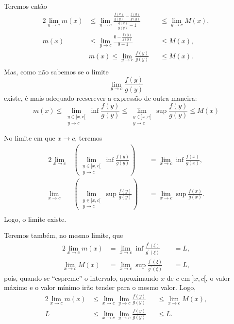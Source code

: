 \documentclass{article}
\begin{document}
Teremos então
\begin{alignat}{2}
 \lim_{y \to c} m(x) &\leq \lim_{y \to c} \frac{\frac{f(x)}{g(y)} - \frac{f(y)}{g(y)}}{\frac{g(x)}{g(y)} - 1} &&\leq \lim_{y \to c} M(x),\\
 m(x) &\leq \lim_{y \to c} \frac{0 - \frac{f(y)}{g(y)}}{0 - 1} &&\leq M(x),\\
 &m(x) \leq \lim_{y \to c} \frac{f(y)}{g(y)} &&\leq M(x).\\
\end{alignat}
Mas, como não sabemos se o limite 
\begin{equation}
 \lim_{y \to c} \frac{f(y)}{g(y)}
\end{equation}
existe, é mais adequado reescrever a expressão de outra maneira:
\begin{equation}
 m(x) \leq \lim_{\substack{y \in ]x,c[\\y \to c}} \inf \frac{f(y)}{g(y)} \leq \lim_{\substack{y \in ]x,c[\\y \to c}} \sup \frac{f(y)}{g(y)} \leq M(x)
\end{equation}

No limite em que $x \to c$, teremos
\begin{alignat}{2}
 \lim_{x \to c} &\left( \lim_{\substack{y \in ]x,c[\\y \to c}} \inf \frac{f(y)}{g(y)} \right) &&= \lim_{x \to c} \inf \frac{f(x)}{g(x)},\\
 \lim_{x \to c} &\left( \lim_{\substack{y \in ]x,c[\\y \to c}} \sup \frac{f(y)}{g(y)} \right) &&= \lim_{x \to c} \sup \frac{f(x)}{g(x)}.\\
\end{alignat}
Logo, o limite existe.

Teremos também, no mesmo limite, que
\begin{alignat}{2}
 \lim_{x \to c} m(x) &= \lim_{x \to c}\inf{\frac{f^{\prime}(\xi)}{g^{\prime}(\xi)}} &&= L,\\
 \lim_{x \to c} M(x) &= \lim_{x \to c} \sup{\frac{f^{\prime}(\xi)}{g^{\prime}(\xi)}} &&= L,
\end{alignat}
pois, quando se ``espreme'' o intervalo, aproximando $x$ de $c$ em $]x,c[$, o valor máximo e o valor mínimo irão tender para o mesmo valor. Logo,
\begin{alignat}{2}
 \lim_{x \to c} m(x) &\leq \lim_{x \to c} \lim_{y \to c} \frac{f(y)}{g(y)} &&\leq \lim_{x \to c}M(x),\\
 L &\leq \lim_{x \to c} \lim_{y \to c} \frac{f(y)}{g(y)} &&\leq L.
\end{alignat}
\end{document}
